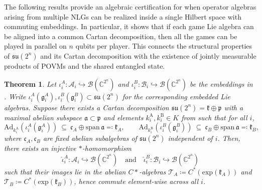 \documentclass{article}
\newtheorem{theorem}{Theorem}
\begin{document}
    The following results provide an algebraic certification for when operator algebras arising from multiple NLGs can be realized inside a single Hilbert space with commuting embeddings. In particular, it shows that if each game Lie algebra can be aligned into a common Cartan decomposition, then all the games can be played in parallel on $n$ qubits per player. This connects the structural properties of $\mathfrak{su}(2^n)$ and its Cartan decomposition with the existence of jointly measurable products of POVMs and the shared entangled state. 
    \begin{theorem}\label{theorem: embedding existence}        
        Let $\iota_i^A:\mathcal A_i\hookrightarrow\mathcal B(\mathbb C^{2^n})$ and  $\iota_i^B:\mathcal B_i\hookrightarrow\mathcal B(\mathbb C^{2^n})$ be the embeddings in . Write $\iota_i^A(\mathfrak g_i^A),\iota_i^B(\mathfrak g_i^B)\subset\mathfrak{su}(2^n)$ for the corresponding embedded Lie algebras. Suppose there exists a Cartan decomposition $\mathfrak{su}(2^n)=\mathfrak{k}\oplus\mathfrak{p}$ with a maximal abelian subspace  $\mathfrak{a}\subset \mathfrak{p}$ and elements $k_i^\mathrm{A},k_i^\mathrm{B}\in K$ from  such that for all $i$,
        \begin{equation}\label{eq:cartan-align}     
            \mathrm{Ad}_{k_i^\mathrm{A}}\left(\iota_i^A(\mathfrak{g}_i^A)\right)\ \subseteq\ \mathfrak{c}_A\oplus \mathrm{span}\,\mathfrak{a}\eqqcolon \mathfrak{k}_A,\qquad \mathrm{Ad}_{k_i^\mathrm{B}}\left(\iota_i^B(\mathfrak{g}_i^B)\right)\ \subseteq\ \mathfrak{c}_B\oplus \mathrm{span}\,\mathfrak{a}\eqqcolon \mathfrak{k}_B,
        \end{equation}
        where $\mathfrak{c}_A,\mathfrak{c}_B$ are fixed abelian subalgebras of $\mathfrak{su}(2^n)$ independent of $i$.
        Then, there exists an injective $*$-homomorphism 
        \begin{equation}
            \widehat{\iota}_i^A: \mathcal{A}_i \hookrightarrow \mathcal{B}(\mathbb{C}^{2^n})\quad\text{and}\quad \widehat{\iota}_i^B:\mathcal{B}_i\hookrightarrow \mathcal{B}(\mathbb{C}^{2^n})
        \end{equation}
        such that their images lie in the abelian $C*$-algebras $\mathcal{T}_A\coloneqq C^*(\mathrm{exp}(\mathfrak{k}_A))$ and $\mathcal{T}_B\coloneqq C^*(\mathrm{exp}(\mathfrak{k}_B))$, hence commute element-wise across all $i$. 
    \end{theorem}
\end{document}
